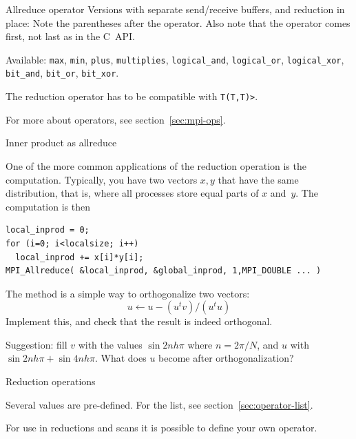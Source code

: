 \begin{mplnote}{Allreduce operator}
  Versions with separate send/receive buffers,
  and reduction in place:
  Note the parentheses after the operator.
  Also note that the operator comes first, not last as in the C~\ac{API}.

  \lstset{language=mpl}
  Available: \lstinline{max}, \lstinline{min}, \lstinline{plus}, \lstinline{multiplies},
  \lstinline{logical_and}, \lstinline{logical_or}, \lstinline{logical_xor},
  \lstinline{bit_and}, \lstinline{bit_or}, \lstinline{bit_xor}.

\begin{mplimpl}
    The reduction operator has to be compatible with
    \lstinline+T(T,T)>+.
\end{mplimpl}
\end{mplnote}

For more about operators, see section~\ref{sec:mpi-ops}.

 {Inner product as allreduce}
\label{sec:dist-reduc}

One of the more common applications of the reduction operation
is the  computation. Typically, you have two vectors $x,y$
that have the same distribution, that is,
where all processes store equal parts of $x$ and~$y$.
The computation is then
\begin{lstlisting}
local_inprod = 0;
for (i=0; i<localsize; i++)
  local_inprod += x[i]*y[i];
MPI_Allreduce( &local_inprod, &global_inprod, 1,MPI_DOUBLE ... ) 
\end{lstlisting}

\begin{exercise}
  \label{ex:gramschmidt}
  The  method is a simple way to orthogonalize
  two vectors:
  \[ u \leftarrow u- (u^tv)/(u^tu) \]
  Implement this, and check that the result is indeed orthogonal.

  Suggestion: fill $v$ with the values $\sin 2nh\pi$ where $n=2\pi/N$,
  and $u$ with $\sin 2nh\pi + \sin 4nh\pi$. What does $u$ become after orthogonalization?
\end{exercise}

 {Reduction operations}
\label{sec:mpi:op-reduct}

Several  values are pre-defined. For the list,
see section~\ref{sec:operator-list}.

For use in reductions and scans it is possible to define your own operator.


